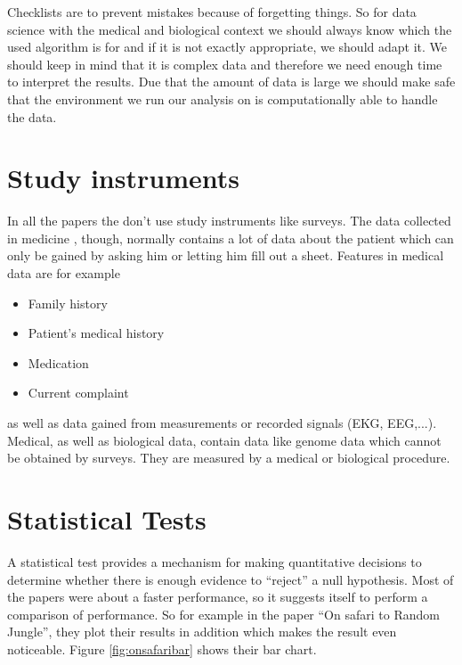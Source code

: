\documentclass{sig-alternate-05-2015}
\begin{document}
Checklists are to prevent mistakes because of forgetting things. So for data science with the medical and biological context we should always know which the used algorithm is for and if it is not exactly appropriate, we should adapt it. We should keep in mind that it is complex data and therefore we need enough time to interpret the results. Due that the amount of data is large we should make safe that the environment we run our analysis on is computationally able to handle the data.

\section{Study instruments}
In all the papers the don't use study instruments like surveys. The data collected in medicine \cite{nmd2004szolo}, though, normally contains a lot of data about the patient which can only be gained by asking him or letting him fill out a sheet. Features in medical data are for example
\begin{itemize}
\item Family history
\item Patient's medical history
\item Medication
\item Current complaint
\end{itemize}
as well as data gained from measurements or recorded signals (EKG, EEG,...). Medical, as well as biological data, contain data like genome data which cannot be obtained by surveys. They are measured by a medical or biological procedure.

\section{Statistical Tests}
A statistical test provides a mechanism for making quantitative decisions to determine whether there is enough evidence to ``reject'' a null hypothesis. Most of the papers were about a faster performance, so it suggests itself to perform a comparison of performance.
So for example in the paper ``On safari to Random Jungle'', they plot their results in addition which makes the result even noticeable. Figure \ref{fig:onsafaribar} shows their bar chart.
\end{document}
